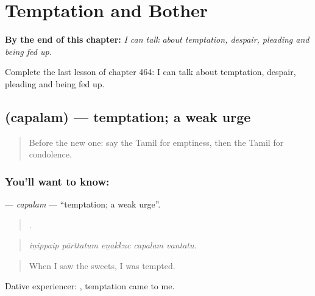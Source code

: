 
\chapter{Temptation and Bother}
\label{ch:ta-temptation-and-bother}

\begin{chapteropening}
\textbf{By the end of this chapter:} \emph{I can talk about temptation, despair, pleading and being fed up.}

Complete the last lesson of chapter 464: I can talk about temptation, despair, pleading and being fed up.
\end{chapteropening}

\section[\texorpdfstring{\ta{சபலம்} (capalam)}{சபலம் (capalam)}]{ (capalam) — temptation; a weak urge}

\label{lesson:TA-C464-capalam}



\begin{quote}
Before the new one: say the Tamil for emptiness, then the Tamil for condolence.
\end{quote}

\subsection*{You'll want to know: }
\textbf{} — \emph{capalam} — \textquotedblleft{}temptation; a weak urge\textquotedblright{}.

\begin{quote}
    .
\end{quote}

\begin{quote}
\emph{iṉippaip pārttatum eṉakkuc capalam vantatu.}
\end{quote}

\begin{quote}
When I saw the sweets, I was tempted.
\end{quote}

Dative experiencer:   , temptation came to me.


